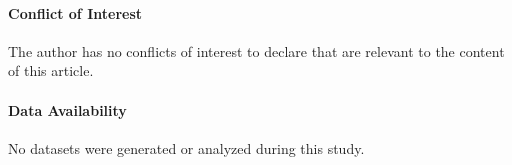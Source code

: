 \documentclass[smallextended]{svjour3}  %
\begin{document}
\paragraph{Conflict of Interest} The author has no conflicts of interest to declare that are relevant to the content of this article.

\paragraph{Data Availability} No datasets were generated or analyzed during this study.


\end{document}
